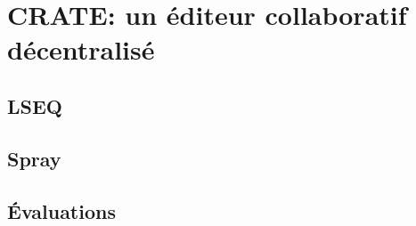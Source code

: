 
\part{CRATE: un éditeur collaboratif décentralisé}

\chapter{LSEQ}
\minitoc
\chapter{Spray}
\minitoc
\chapter{Évaluations}
\minitoc


